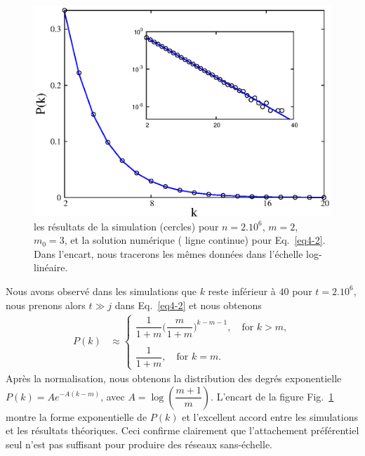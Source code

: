 \begin{figure}[h]
	\centering
	\includegraphics{./figures/fig1}
	\caption{les résultats de la simulation (cercles)  pour $n=2.10^6$, $m=2$, $m_0=3$, et la solution numérique (	ligne continue) pour Eq.~\eqref{eq4-2}. Dans l'encart, nous tracerons les mêmes données dans l'échelle log-linéaire.}
	\label{fig1-2}
 \end{figure} 
Nous avons observé dans les simulations que $k$ reste inférieur à $40$ pour $t=2.10^6$, nous prenons alors $t\gg j $ dans Eq.~\eqref{eq4-2} et nous obtenons
\begin{align}
P(k)&\approx 
\begin{cases}
\dfrac{1}{1+m}\Big(\dfrac{m}{1+m}\Big)^{k-m-1}, \quad \textrm{for }  k>m,\\
\\
\dfrac{1}{1+m}, \quad\textrm{for }  k=m.
\end{cases}
\label{eq5-2}
\end{align}
Après la normalisation, nous obtenons la distribution des degrés exponentielle $P(k)=Ae^{-A(k-m)}$, avec $A=\log(\dfrac{m+1}{m})$.
L'encart de la figure Fig.~\ref{fig1-2} montre la forme exponentielle de $ P(k)$ et l'excellent accord entre les simulations et les résultats théoriques.
Ceci confirme clairement que l'attachement préférentiel seul n'est pas suffisant pour produire des réseaux sans-échelle.

